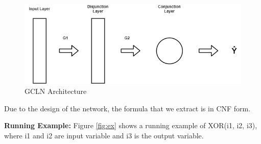 \begin{figure}
	\centering
    \includegraphics[scale=0.4]{gcln.png}
    \caption{GCLN Architecture}
    \label{fig:gcln}
\end{figure}

Due to the design of the network, the formula that we extract is in CNF form.
\newline

\noindent\textbf{Running Example:} Figure \ref{fig:ex} shows a running example of XOR(i1, i2, i3), 
where i1 and i2 are input variable and i3 is the output variable.

